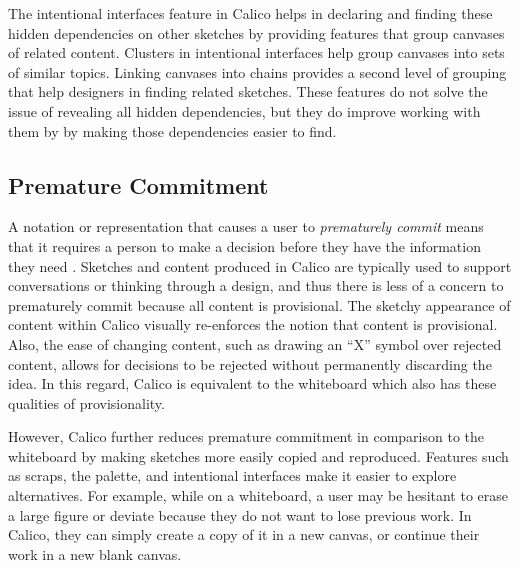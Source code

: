 The intentional interfaces feature in Calico helps in declaring and finding these hidden dependencies on other sketches by providing features that group canvases of related content. Clusters in intentional interfaces help group canvases into sets of similar topics. Linking canvases into chains provides a second level of grouping that help designers in finding related sketches. These features do not solve the issue of revealing all hidden dependencies, but they do improve working with them by by making those dependencies easier to find.

\subsection{Premature Commitment}
A notation or representation that causes a user to \textit{prematurely commit} means that it requires a person to make a decision before they have the information they need \cite{Petre2013BookChapter}. Sketches and content produced in Calico are typically used to support conversations or thinking through a design, and thus there is less of a concern to prematurely commit because all content is provisional. The sketchy appearance of content within Calico visually re-enforces the notion that content is provisional. Also, the ease of changing content, such as drawing an ``X'' symbol over rejected content, allows for decisions to be rejected without permanently discarding the idea. In this regard, Calico is equivalent to the whiteboard which also has these qualities of provisionality. 

However, Calico further reduces premature commitment in comparison to the whiteboard by making sketches more easily copied and reproduced. Features such as scraps, the palette, and intentional interfaces make it easier to explore alternatives. For example, while on a whiteboard, a user may be hesitant to erase a large figure or deviate because they do not want to lose previous work. In Calico, they can simply create a copy of it in a new canvas, or continue their work in a new blank canvas.


